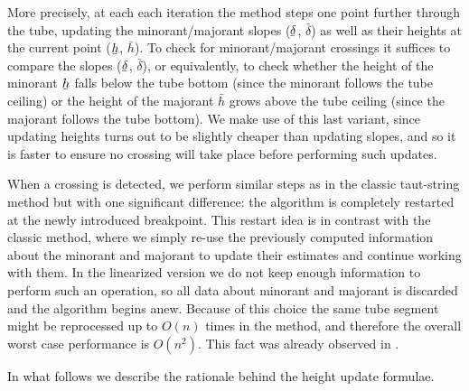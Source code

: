 \documentclass[twoside,11pt]{article}
\newcommand{\ubar}[1]{\underaccent{\bar}{#1}}
\numberwithin{equation}{section}
\numberwithin{theorem}{section}
\begin{document}
More precisely, at each each iteration the method steps one point further through the tube, updating the minorant/majorant slopes  ($\ubar \delta$, $\bar \delta$) as well as their heights at the current point ($\ubar h$, $\bar h$). To check for minorant/majorant crossings it suffices to compare the slopes ($\ubar \delta$, $\bar \delta$), or equivalently, to check whether the height of the minorant $\ubar h$ falls below the tube bottom (since the minorant follows the tube ceiling) or the height of the majorant $\bar h$ grows above the tube ceiling (since the majorant follows the tube bottom). We make use of this last variant, since updating heights turns out to be slightly cheaper than updating slopes, and so it is faster to ensure no crossing will take place before performing such updates.

When a crossing is detected, we perform similar steps as in the classic taut-string method but with one significant difference: the algorithm is completely restarted at the newly introduced breakpoint. This restart idea is in contrast with the classic method, where we simply re-use the previously computed information about the minorant and majorant to update their estimates and continue working with them. In the linearized version we do not keep enough information to perform such an operation, so all data about minorant and majorant is discarded and the algorithm begins anew. Because of this choice the same tube segment might be reprocessed up to $O(n)$ times in the method, and therefore the overall worst case performance is $O(n^2)$. This fact was already observed in \citep{fastTV}.

In what follows we describe the rationale behind the height update formulae.
\end{document}
